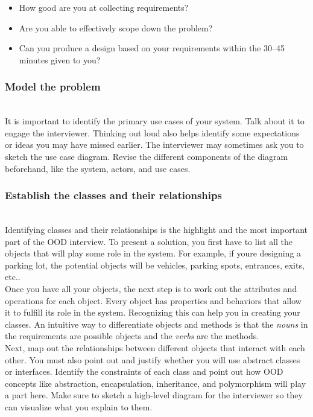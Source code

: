 \begin{itemize}
\item
\protect{}\label{AIEiX0z-Pry9KrxyVmQJk}
How good are you at collecting requirements?
\item
\protect{}\label{iqmCHQxhn80QAm0tCl9kA}
Are you able to effectively scope down the problem?
\item
\protect{}\label{tBZgPrsEPrsBMGBWXGf0I}
Can you produce a design based on your requirements within the 30--45 minutes given to you?
\end{itemize}

\subsubsection{Model the problem}\label{XBbKjDhc-Z4SU9757WADG}
\\
It is important to identify the primary use cases of your system. Talk about it to engage the interviewer. Thinking out loud also helps identify some expectations or ideas you may have missed earlier. The interviewer may sometimes ask you to sketch the use case diagram. Revise the different components of the diagram beforehand, like the system, actors, and use cases.

\subsubsection{Establish the classes and their relationships}\label{QzY5XbPHwzAWSXXoEKTvj}
\\
Identifying classes and their relationships is the highlight and the most important part of the OOD interview. To present a solution, you first have to list all the objects that will play some role in the system. For example, if you\textquotesingle re designing a parking lot, the potential objects will be vehicles, parking spots, entrances, exits, etc..
\\
Once you have all your objects, the next step is to work out the attributes and operations for each object. Every object has properties and behaviors that allow it to fulfill its role in the system. Recognizing this can help you in creating your classes. An intuitive way to differentiate objects and methods is that the \emph{nouns} in the requirements are possible objects and the \emph{verbs} are the methods.
\\
Next, map out the relationships between different objects that interact with each other. You must also point out and justify whether you will use abstract classes or interfaces. Identify the constraints of each class and point out how OOD concepts like abstraction, encapsulation, inheritance, and polymorphism will play a part here. Make sure to sketch a high-level diagram for the interviewer so they can visualize what you explain to them.

